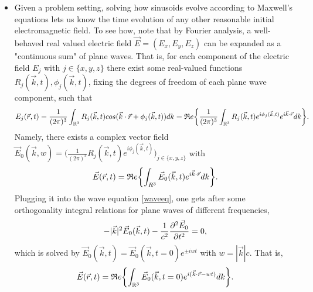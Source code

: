 \documentclass[11pt, a4paper, twoside]{article} %
\newcommand{\R}{\mathbb{R}} %
\begin{document}
\begin{itemize}
\item Given a problem setting, solving how sinusoids evolve according to Maxwell's equations lets us know the time evolution of any other reasonable initial electromagnetic field. To see how, note that by Fourier analysis, a well-behaved real valued electric field $\vec{E}=(E_x,E_y,E_z)$ can be expanded as a "continuous sum" of plane waves. That is, for each component of the electric field $E_j$ with $j\in\{x,y,z\}$ there exist some real-valued functions $R_j(\vec{k},t),\phi_j(\vec{k},t)$, fixing the degrees of freedom of each plane wave component, such that\vspace{-0.1cm}
\begin{equation}
E_j(\vec{r},t)={\small \frac{1}{(2\pi)^3}}\int_{\R^3} R_j(\vec{k},t)cos(\vec{k}\cdot\vec{r}+\phi_j(\vec{k},t))dk
=\mathfrak{R}e\qty{{\small\frac{1}{(2\pi)^3}}\int_{\R^3}R_j(\vec{k},t)e^{i\phi_j(\vec{k},t)}e^{i\vec{k}\cdot\vec{r}}dk}.\vspace{-0.1cm}
\end{equation}
Namely, there exists a complex vector field $\vec{E}_0(\vec{k},w)=(\frac{1}{(2\pi)^3}R_j(\vec{k},t)e^{i\phi_j(\vec{k},t)}\big)_{j\in\{x,y,z\}}$ with\vspace{-0.1cm}
\begin{equation}
\vec{E}(\vec{r},t)=\mathfrak{R}e\qty{\int_{R^3}\vec{E}_0(\vec{k},t)e^{i\vec{k}\cdot\vec{r}}dk}.\vspace{-0.1cm}
\end{equation}
Plugging it into the wave equation \eqref{waveeq}, one gets after some orthogonality integral relations for plane waves of different frequencies,\vspace{-0.2cm}
\begin{equation}
-|\vec{k}|^2\vec{E}_0(\vec{k},t)-\frac{1}{c^2}\pdv[2]{\vec{E}_0}{t}=0,
\end{equation}
which is solved by $\vec{E}_0(\vec{k},t)=\vec{E}_0(\vec{k},t=0)e^{\pm iwt}$ with $w=|\vec{k}|c$. That is,
\begin{equation}
\vec{E}(\vec{r},t)=\mathfrak{R}e\qty{\int_{\R^3}\vec{E}_0(\vec{k},t=0)e^{i(\vec{k}\cdot\vec{r}-wt)}dk}.
\end{equation}

\end{itemize}
\end{document}
